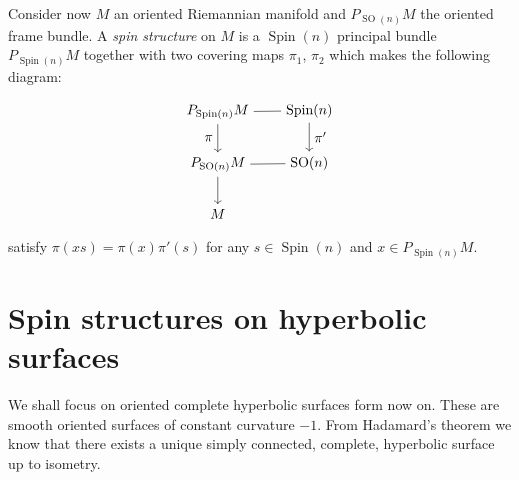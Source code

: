 \documentclass[12pt]{amsart}
\theoremstyle{definition}
\newcommand{\so}{\operatorname{SO}}
\newcommand{\spin}{\operatorname{Spin}}
\begin{document}
Consider now $M$ an oriented Riemannian manifold and $P_{\so(n)}M$ the oriented frame bundle. A \emph{spin structure} on $M$ is a $\spin(n)$ principal bundle $P_{\spin(n)}M$ together with two covering maps $\pi_1$, $\pi_2$ which makes the following diagram:
\begin{equation}\label{spinStructureDiagram}
\begin{tikzpicture}[baseline=(current  bounding  box.center)]
  \matrix (m) [matrix of math nodes,row sep=2em,column sep=2em,minimum width=2em]
  {
      P_{\text{Spin}(n)} M & \text{Spin}(n) \\
        P_{\text{SO}(n)} M & \text{SO}(n) \\
	    M & {} \\  
  };
  \path
    (m-1-1) edge node [ above] {} (m-1-2)
    (m-2-1) edge node [below] {} (m-2-2);
    
    
  \path[->] 
  	(m-1-1) edge node [left]{$\pi$} (m-2-1)
  	(m-1-2) edge node [right] {$\pi'$} (m-2-2)
  	(m-2-1) edge node [left] {} (m-3-1);
\end{tikzpicture}
\end{equation}
satisfy $\pi(xs) = \pi(x) \pi'(s)$ for any $s\in \spin(n)$ and $x \in P_{\spin(n)} M$.

\section{Spin structures on hyperbolic surfaces}
We shall focus on oriented complete hyperbolic surfaces form now on. These are smooth oriented surfaces of constant curvature $-1$. From Hadamard's theorem we know that there exists a unique simply connected, complete, hyperbolic surface up to isometry. 
\end{document}
